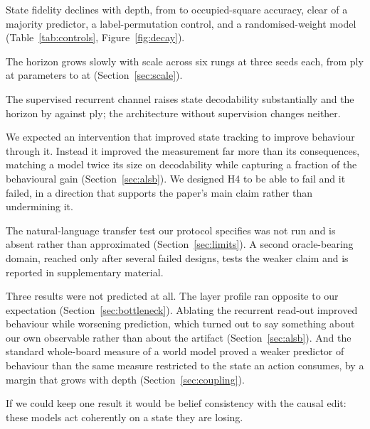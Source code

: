 \documentclass[manuscript, screen, review]{jair}
\theoremstyle{remark}
\begin{document}
\begin{description}[nosep]
\item[H1, supported.] State fidelity declines with depth, from
 to  occupied-square accuracy, clear of a
majority predictor, a label-permutation control, and a randomised-weight model
(Table~\ref{tab:controls}, Figure~\ref{fig:decay}).
\item[H2, supported.] The horizon grows slowly with scale across six rungs at
three seeds each, from  ply at  parameters
to  at  (Section~\ref{sec:scale}).
\item[H3, supported only weakly.] The supervised recurrent channel raises state
decodability substantially and the horizon by  against
 ply; the architecture without supervision changes neither.
\item[H4, not supported as predicted.] We expected an intervention that improved
state tracking to improve behaviour through it. Instead it improved the
measurement far more than its consequences, matching a model twice its size on
decodability while capturing a fraction of the behavioural gain
(Section~\ref{sec:alsb}). We designed H4 to be able to fail and it failed, in a
direction that supports the paper's main claim rather than undermining it.
\item[H5, partially addressed.] The natural-language transfer test our protocol
specifies was not run and is absent rather than approximated
(Section~\ref{sec:limits}). A second oracle-bearing domain, reached only after
several failed designs, tests the weaker claim and is reported in supplementary
material.
\end{description}

Three results were not predicted at all. The layer profile ran opposite to our
expectation (Section~\ref{sec:bottleneck}). Ablating the recurrent read-out
improved behaviour while worsening prediction, which turned out to say something
about our own observable rather than about the artifact
(Section~\ref{sec:alsb}). And the standard whole-board measure of a world model
proved a weaker predictor of behaviour than the same measure restricted to the
state an action consumes, by a margin that grows with depth
(Section~\ref{sec:coupling}).

If we could keep one result it would be belief consistency with the causal edit:
these models act coherently on a state they are losing.
\end{document}
